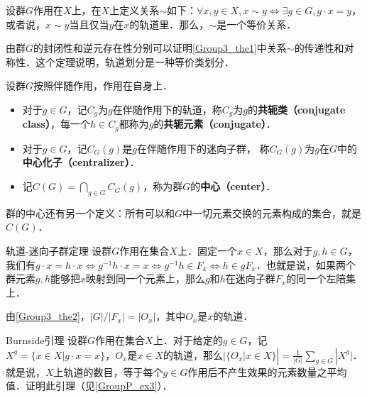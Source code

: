 \begin{theorem}{}\label{Group3_the1}
设群$G$作用在$X$上，在$X$上定义关系$\sim$如下：$\forall x, y\in X, x\sim y \iff \exists g\in G, g\cdot x=y$，或者说，$x\sim y$当且仅当$y$在$x$的轨道里．那么，$\sim$是一个等价关系．
\end{theorem}

由群$G$的封闭性和逆元存在性分别可以证明\autoref{Group3_the1}中关系$\sim$的传递性和对称性．这个定理说明，轨道划分是一种等价类划分．

\begin{definition}{}
设群$G$按照伴随作用，作用在自身上．
\begin{itemize}
\item 对于$g\in G$，记$C_g$为$g$在伴随作用下的轨道，称$C_g$为$g$的\textbf{共轭类（conjugate class）}，每一个$h\in C_g$都称为$g$的\textbf{共轭元素（conjugate）}．

\item 对于$g\in G$，记$C_G(g)$是$g$在伴随作用下的迷向子群， 称$C_G(g)$为$g$在$G$中的\textbf{中心化子（centralizer）}．

\item 记$C(G)=\bigcap_{g\in G} C_G(g)$，称为群$G$的\textbf{中心（center）}．
\end{itemize}
\end{definition}

群的中心还有另一个定义：所有可以和$G$中一切元素交换的元素构成的集合，就是$C(G)$．

\begin{theorem}{轨道-迷向子群定理}\label{Group3_the2}
设群$G$作用在集合$X$上．固定一个$x\in X$，那么对于$g, h\in G$，我们有$g\cdot x=h\cdot x\iff g^{-1}h\cdot x=x\iff g^{-1}h\in F_x\iff h\in gF_x$．也就是说，如果两个群元素$g, h$能够把$x$映射到同一个元素上，那么$g$和$h$在迷向子群$F_x$的同一个左陪集上．
\end{theorem}

\begin{corollary}{}\label{Group3_cor1}
由\autoref{Group3_the2}，$|G|/|F_x|=|O_x|$，其中$O_x$是$x$的轨道．
\end{corollary}

\begin{exercise}{Burnside引理}\label{Group3_exe2}
设群$G$作用在集合$X$上．对于给定的$g\in G$，记$X^g=\{x\in X|g\cdot x=x\}$，$O_x$是$x\in X$的轨道，那么$|\{O_x|x\in X\}|=\frac{1}{|G|}\sum_{g\in G}|X^g|$．就是说，$X$上轨道的数目，等于每个$g\in G$作用后不产生效果的元素数量之平均值．证明此引理（见\autoref{GroupP_ex3}）．
\end{exercise}

